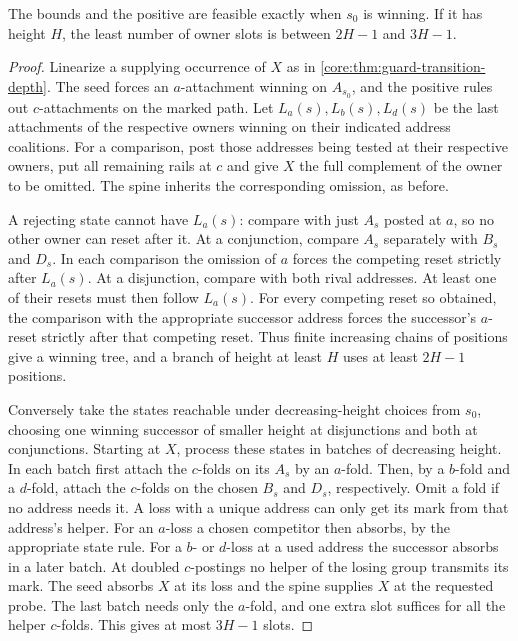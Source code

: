 \begin{theorem}
\label{core:thm:alternating-rail-transitions}
The bounds and the positive are feasible exactly when $s_0$ is
winning. If it has height $H$, the least number of owner slots
is between $2H-1$ and $3H-1$.
\end{theorem}
\begin{proof}
Linearize a supplying occurrence of $X$ as in
\cref{core:thm:guard-transition-depth}. The seed forces an
$a$-attachment winning on $A_{s_0}$, and the positive rules out
$c$-attachments on the marked path. Let $L_a(s),L_b(s),L_d(s)$ be
the last attachments of the respective owners winning on their
indicated address coalitions. For a comparison, post those addresses
being tested at their respective owners, put all remaining rails
at $c$ and give $X$ the full complement of the owner to be omitted.
The spine inherits the corresponding omission, as before.

A rejecting state cannot have $L_a(s)$: compare with just $A_s$
posted at $a$, so no other owner can reset after it. At a conjunction,
compare $A_s$ separately with $B_s$ and $D_s$. In each comparison the
omission of $a$ forces the competing reset strictly after $L_a(s)$.
At a disjunction, compare with both rival addresses. At least one
of their resets must then follow $L_a(s)$. For every competing reset
so obtained, the comparison with the appropriate successor address
forces the successor's $a$-reset strictly after that competing reset.
Thus finite increasing chains of positions give a winning tree, and
a branch of height at least $H$ uses at least $2H-1$ positions.

Conversely take the states reachable under decreasing-height choices
from $s_0$, choosing one winning successor of smaller height at
disjunctions and both at conjunctions. Starting at $X$, process
these states in batches of decreasing height. In each batch first
attach the $c$-folds on its $A_s$ by an $a$-fold. Then, by a $b$-fold
and a $d$-fold, attach the $c$-folds on the chosen $B_s$ and $D_s$,
respectively. Omit a fold if no address needs it. A loss with a
unique address can only get its mark from that address's helper.
For an $a$-loss a chosen competitor then absorbs, by the appropriate
state rule. For a $b$- or $d$-loss at a used address the successor
absorbs in a later batch. At doubled $c$-postings no helper of the
losing group transmits its mark. The seed absorbs $X$ at its loss
and the spine supplies $X$ at the requested probe. The last batch
needs only the $a$-fold, and one extra slot suffices for all the
helper $c$-folds. This gives at most $3H-1$ slots.
\end{proof}

